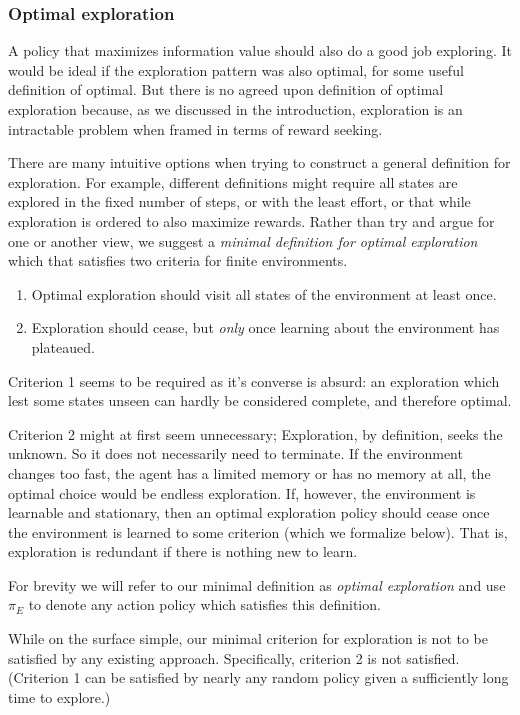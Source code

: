 \documentclass[9pt,twocolumn,twoside]{pnas-new}
\begin{document}
{{\subsubsection*{Optimal exploration}
A policy that maximizes information value should also do a good job exploring. It would be ideal if the exploration pattern was also optimal, for some useful definition of optimal. But there is no agreed upon definition of optimal exploration because, as we discussed in the introduction, exploration is an intractable problem when framed in terms of reward seeking. 

There are many intuitive options when trying to construct a general definition for exploration. For example, different definitions might require all states are explored in the fixed number of steps, or with the least effort, or that while exploration is ordered to also maximize rewards. Rather than try and argue for one or another view, we suggest a \textit{minimal definition for optimal exploration} which that satisfies two criteria for finite environments. 

\begin{enumerate}[noitemsep,wide=0pt,leftmargin=\dimexpr\labelwidth+2\labelsep\relax]
    \item Optimal exploration should visit all states of the environment at least once. 
    \item Exploration should cease, but \textit{only} once learning about the environment has plateaued. 
\end{enumerate}

Criterion 1 seems to be required as it's converse is absurd: an exploration which lest some states unseen can hardly be considered complete, and therefore optimal.

Criterion 2 might at first seem unnecessary; Exploration, by definition, seeks the unknown. So it does not necessarily need to terminate. If the environment changes too fast, the agent has a limited memory or has no memory at all, the optimal choice would be endless exploration. If, however, the environment is learnable and stationary, then an optimal exploration policy should cease once the environment is learned to some criterion (which we formalize below). That is, exploration is redundant if there is nothing new to learn.

For brevity we will refer to our minimal definition as \textit{optimal exploration} and use $\pi_E$ to denote any action policy which satisfies this definition.

While on the surface simple, our minimal criterion for exploration is not  to be satisfied by any existing approach. Specifically, criterion 2 is not satisfied. (Criterion 1 can be satisfied by nearly any random policy given a sufficiently long time to explore.) %


}}
\end{document}
